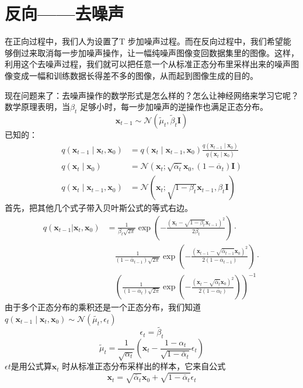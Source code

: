\documentclass[]{report}
\begin{document}
\section{反向——去噪声}
在正向过程中，我们人为设置了T
步加噪声过程。而在反向过程中，我们希望能够倒过来取消每一步加噪声操作，让一幅纯噪声图像变回数据集里的图像。这样，利用这个去噪声过程，我们就可以把任意一个从标准正态分布里采样出来的噪声图像变成一幅和训练数据长得差不多的图像，从而起到图像生成的目的。

现在问题来了：去噪声操作的数学形式是怎么样的？怎么让神经网络来学习它呢？数学原理表明，当$\beta_t$
足够小时，每一步加噪声的逆操作也满足正态分布。
\[
\mathbf{x}_{t-1} \sim \mathcal{N}\left(\tilde{\mu}_t, \tilde{\beta}_t \mathbf{I}\right)
\]
已知的：
\begin{align*}
	q\left(\mathbf{x}_{t-1} \mid \mathbf{x}_{t}, \mathbf{x}_0\right) &= q\left(\mathbf{x}_{t} \mid \mathbf{x}_{t-1}, \mathbf{x}_0\right) \frac{q\left(\mathbf{x}_{t-1} \mid \mathbf{x}_0\right)}{q\left(\mathbf{x}_{t} \mid \mathbf{x}_0\right)} \\
	q\left(\mathbf{x}_{t} \mid \mathbf{x}_0\right) &= \mathcal{N}\left(\mathbf{x}_{t}; \sqrt{\overline{\alpha}_t} \mathbf{x}_0, (1 - \overline{\alpha}_t) \mathbf{I}\right) \\
	q\left(\mathbf{x}_{t} \mid \mathbf{x}_{t-1}, \mathbf{x}_0\right) &= \mathcal{N}\left(\mathbf{x}_{t}; \sqrt{1 - \beta_t} \mathbf{x}_{t-1}, \beta_t \mathbf{I}\right)
\end{align*}
首先，把其他几个式子带入贝叶斯公式的等式右边。
\begin{align*}
	q(\mathbf{x}_{t-1}|\mathbf{x}_t,\mathbf{x}_0) &= \frac{1}{\beta_t \sqrt{2\pi}} \exp\left(-\frac{(\mathbf{x}_t - \sqrt{1 - \beta_t} \mathbf{x}_{t-1})^2}{2\beta_t}\right) \cdot \\
	&\quad \frac{1}{\left(1 - \overline{\alpha}_{t-1}\right)\sqrt{2\pi}} \exp\left(-\frac{\left(\mathbf{x}_{t-1} - \sqrt{\overline{\alpha}_{t-1}} \mathbf{x}_0\right)^2}{2\left(1 - \overline{\alpha}_{t-1}\right)}\right) \cdot \\
	&\quad \left(\frac{1}{\left(1 - \overline{\alpha}_t\right)\sqrt{2\pi}} \exp\left(-\frac{\left(\mathbf{x}_t - \sqrt{\overline{\alpha}_t} \mathbf{x}_0\right)^2}{2\left(1 - \overline{\alpha}_t\right)}\right)\right)^{-1}
\end{align*}
由于多个正态分布的乘积还是一个正态分布，我们知道$q\left( \mathbf{x}_{t-1} \mid \mathbf{x}_t, \mathbf{x}_0 \right)\sim \mathcal{N}(\tilde{\mu_t},\epsilon_t)$\\
\[
\epsilon_t=\tilde{\beta_t}
\]
\[
\tilde{\mu}_t = \frac{1}{\sqrt{\alpha_t}} \left( \mathbf{x}_t - \frac{1 - \alpha_t}{\sqrt{1 - \bar{\alpha}_t}} \epsilon_t \right)
\]
$\epsilon{t}$是用公式算$\mathbf{x}_t$
时从标准正态分布采样出的样本，它来自公式
\[
\mathbf{x}_t = \sqrt{\bar{\alpha}_t} \mathbf{x}_0 + \sqrt{1 - \bar{\alpha}_t} \epsilon_t
\]
\end{document}
